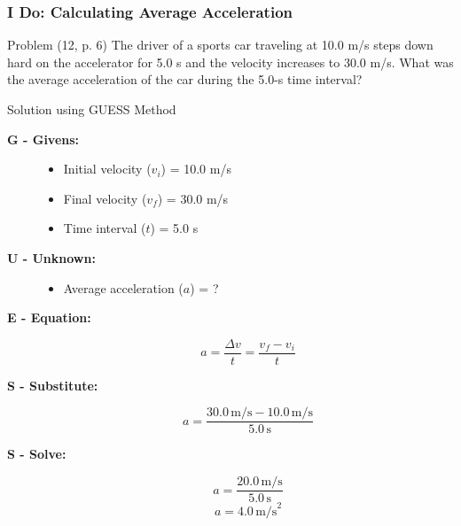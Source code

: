 \documentclass{beamer}
\begin{document}
\begin{frame}[allowframebreaks]
\frametitle{I Do: Calculating Average Acceleration}
\begin{block}{Problem (12, p. 6)}
The driver of a sports car traveling at 10.0 m/s steps down hard on the accelerator for 5.0 s and the velocity increases to 30.0 m/s. What was the average acceleration of the car during the 5.0-s time interval?
\end{block}
\vspace{1em}
\pause
\begin{block}{Solution using GUESS Method}
\begin{description}
    \item[\textbf{G - Givens:}]
        \begin{itemize}
            \item Initial velocity ($v_i$) = 10.0 m/s
            \item Final velocity ($v_f$) = 30.0 m/s
            \item Time interval ($t$) = 5.0 s
        \end{itemize}
    \item[\textbf{U - Unknown:}]
        \begin{itemize}
            \item Average acceleration ($a$) = ?
        \end{itemize}
    \item[\textbf{E - Equation:}]
        \[ a = \frac{\Delta v}{t} = \frac{v_f - v_i}{t} \]
\framebreak
    \item[\textbf{S - Substitute:}]
        \[ a = \frac{30.0 \, \text{m/s} - 10.0 \, \text{m/s}}{5.0 \, \text{s}} \]
    \item[\textbf{S - Solve:}]
        \[ a = \frac{20.0 \, \text{m/s}}{5.0 \, \text{s}} \]
        \[ a = 4.0 \, \text{m/s}^2 \]
\end{description}
\end{block}
\end{frame}
\end{document}
